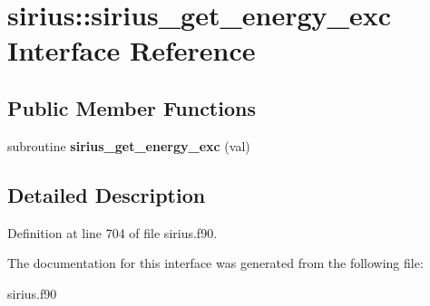 \hypertarget{interfacesirius_1_1sirius__get__energy__exc}{}\section{sirius\+:\+:sirius\+\_\+get\+\_\+energy\+\_\+exc Interface Reference}
\label{interfacesirius_1_1sirius__get__energy__exc}
\subsection*{Public Member Functions}
\begin{DoxyCompactItemize}
\item 
\hypertarget{interfacesirius_1_1sirius__get__energy__exc_a633a6c069a343f4b804fa0bdcd9b46bd}{}subroutine {\bfseries sirius\+\_\+get\+\_\+energy\+\_\+exc} (val)\label{interfacesirius_1_1sirius__get__energy__exc_a633a6c069a343f4b804fa0bdcd9b46bd}

\end{DoxyCompactItemize}


\subsection{Detailed Description}


Definition at line 704 of file sirius.\+f90.



The documentation for this interface was generated from the following file\+:\begin{DoxyCompactItemize}
\item 
sirius.\+f90\end{DoxyCompactItemize}
